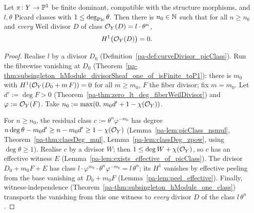 \begin{theorem}
  \label{pa-thm:flv_class_form}
  \leanok

  Let \(\pi \colon Y \to \mathbb{P}^1\) be finite dominant, compatible with the structure
  morphisms, and \(l, \theta\) Picard classes with \(1 \le \deg_{\operatorname{Pic}}\theta\). Then there
  is \(n_0 \in \mathbb{N}\) such that for all \(n \ge n_0\) and \emph{every} Weil divisor \(D\) of
  class \(\mathcal{O}_{Y}(D) = l \cdot \theta^{n}\),
  \[
    H^1\bigl(\mathcal{O}_{Y}(D)\bigr) = 0 .
  \]
\end{theorem}
\begin{proof}
  \leanok
  Realise \(l\) by a divisor \(D_0\) (Definition~\ref{pa-def:curveDivisor_picClass}). Run the
  fibrewise vanishing at \(D_0\)
  (Theorem~\ref{pa-thm:subsingleton_hModule_divisorSheaf_one_of_isFinite_toP1}): there is
  \(m_0\) with \(H^1(\mathcal{O}_{Y}(D_0 + m\,F)) = 0\) for all \(m \ge m_0\), \(F\) the fiber
  divisor; fix \(m = m_0\). Let \(d' := \deg F > 0\)
  (Theorem~\ref{pa-thm:zero_lt_deg_fiberWeilDivisor}) and \(\varphi := \mathcal{O}_{Y}(F)\). Take
  \(n_0 := \max(0,\, m_0 d' + 1 - \chi(\mathcal{O}_{Y}))\).

  For \(n \ge n_0\), the residual class \(c := \theta^{n}\varphi^{-m_0}\) has degree
  \(n \deg\theta - m_0 d' \ge n - m_0 d' \ge 1 - \chi(\mathcal{O}_{Y})\)
  (Lemma~\ref{pa-lem:picClass_nsmul}, Theorem~\ref{pa-thm:classDeg_mul},
  Lemma~\ref{pa-lem:classDeg_zpow}, using \(\deg\theta \ge 1\)). Realise \(c\) by a divisor
  \(W\); then \(1 \le \deg W + \chi(\mathcal{O}_{Y})\), so \(c\) has an effective witness \(E\)
  (Lemma~\ref{pa-lem:exists_effective_of_picClass}). The divisor \(D_0 + m_0 F + E\) has class
  \(l \cdot \varphi^{m_0} \cdot \theta^{n}\varphi^{-m_0} = l\,\theta^{n}\); its \(H^1\)
  vanishes by effective peeling from the base vanishing at \(D_0 + m_0 F\)
  (Lemma~\ref{pa-lem:peel_effective}). Finally, witness-independence
  (Theorem~\ref{pa-thm:subsingleton_hModule_one_class}) transports the vanishing from this one
  witness to \emph{every} divisor \(D\) of the class \(l\,\theta^{n}\).
\end{proof}

